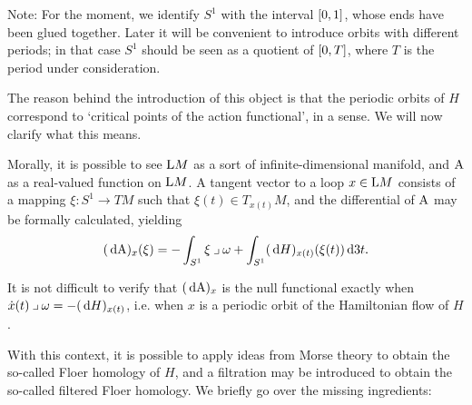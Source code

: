 Note: For the moment, we identify $S^1$ with the interval $\interval01$, whose ends have been glued together. Later it will be convenient to introduce orbits with different periods; in that case $S^1$ should be seen as a quotient of $\interval0T$, where $T$ is the period under consideration.

The reason behind the introduction of this object is that the periodic orbits of $H$ correspond to `critical points of the action functional', in a sense. We will now clarify what this means.

Morally, it is possible to see $\LL M$ as a sort of infinite-dimensional manifold, and $\AA$ as a real-valued function on $\LL M$. A tangent vector to a loop $x \in \LL M$ consists of a mapping $\xi \colon S^1 \to TM$ such that $\xi(t) \in T_{x(t)} M$, and the differential of $\AA$ may be formally calculated, yielding
\begin{equation}
(\dl \AA)_x(\xi) = - \int_{S^1} \xi \into \omega + \int_{S^1} (\dl H)_{x(t)} (\xi(t)) \dl3t. 
\end{equation}

It is not difficult to verify that $(\dl \AA)_x$ is the null functional exactly when $\dot x(t) \into \omega = - (\dl H)_{x(t)}$, i.e. when $x$ is a periodic orbit of the Hamiltonian flow of $H$.

With this context, it is possible to apply ideas from Morse theory to obtain the so-called Floer homology of $H$, and a filtration may be introduced to obtain the so-called filtered Floer homology. We briefly go over the missing ingredients:

